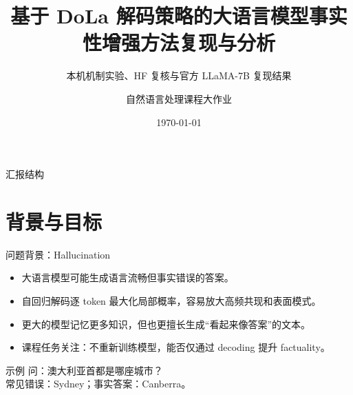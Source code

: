 \documentclass[aspectratio=169,11pt]{ctexbeamer}
\title[DoLa 事实性增强]{基于 DoLa 解码策略的大语言模型事实性增强方法复现与分析}
\subtitle{本机机制实验、HF 复核与官方 LLaMA-7B 复现结果}
\author{自然语言处理课程大作业}
\institute{NLPpre}
\date{\today}
\begin{document}
\begin{frame}
  \titlepage
\end{frame}

\begin{frame}{汇报结构}
  \tableofcontents
\end{frame}

\section{背景与目标}

\begin{frame}{问题背景：Hallucination}
  \begin{itemize}
    \item 大语言模型可能生成语言流畅但事实错误的答案。
    \item 自回归解码逐 token 最大化局部概率，容易放大高频共现和表面模式。
    \item 更大的模型记忆更多知识，但也更擅长生成“看起来像答案”的文本。
    \item 课程任务关注：不重新训练模型，能否仅通过 decoding 提升 factuality。
  \end{itemize}

  \vspace{0.4em}
  \begin{block}{示例}
    问：澳大利亚首都是哪座城市？\\
    常见错误：Sydney；事实答案：Canberra。
  \end{block}
\end{frame}
\end{document}
